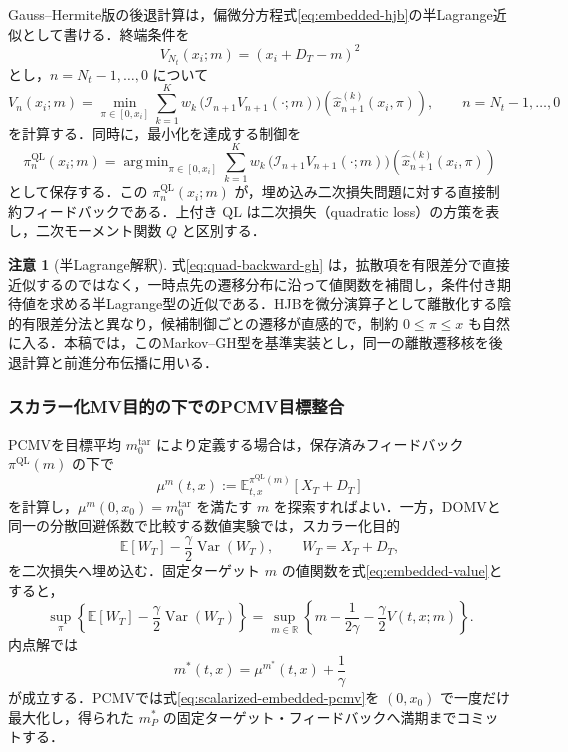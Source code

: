 \documentclass[10pt,a4paper]{article}
\theoremstyle{plain}
\theoremstyle{definition}
\newtheorem{remark}{注意}
\newcommand{\E}{\mathbb{E}}
\DeclareMathOperator{\Var}{Var}
\DeclareMathOperator*{\argmin}{arg\,min}
\begin{document}
Gauss--Hermite版の後退計算は，偏微分方程式\eqref{eq:embedded-hjb}の半Lagrange近似として書ける．終端条件を
\begin{equation}
  V_{N_t}(x_i;m)=(x_i+D_T-m)^2
  \label{eq:terminal-discrete-quad}
\end{equation}
とし，$n=N_t-1,\ldots,0$ について
\begin{equation}
  V_n(x_i;m)=
  \min_{\pi\in[0,x_i]}
  \sum_{k=1}^K w_k\,
  \bigl(\mathcal I_{n+1}V_{n+1}(\cdot;m)\bigr)
  \left(\widehat{x}_{n+1}^{(k)}(x_i,\pi)\right),
  \qquad n=N_t-1,\ldots,0
  \label{eq:quad-backward-gh}
\end{equation}
を計算する．同時に，最小化を達成する制御を
\begin{equation}
  \pi_n^{\mathrm{QL}}(x_i;m)=
  \argmin_{\pi\in[0,x_i]}
  \sum_{k=1}^K w_k\,
  \bigl(\mathcal I_{n+1}V_{n+1}(\cdot;m)\bigr)
  \left(\widehat{x}_{n+1}^{(k)}(x_i,\pi)\right)
  \label{eq:quad-feedback-gh}
\end{equation}
として保存する．この $\pi_n^{\mathrm{QL}}(x_i;m)$ が，埋め込み二次損失問題に対する直接制約フィードバックである．上付き $\mathrm{QL}$ は二次損失（quadratic loss）の方策を表し，二次モーメント関数 $Q$ と区別する．

\begin{remark}[半Lagrange解釈]
式\eqref{eq:quad-backward-gh} は，拡散項を有限差分で直接近似するのではなく，一時点先の遷移分布に沿って値関数を補間し，条件付き期待値を求める半Lagrange型の近似である．HJBを微分演算子として離散化する陰的有限差分法と異なり，候補制御ごとの遷移が直感的で，制約 $0\leq\pi\leq x$ も自然に入る．本稿では，このMarkov--GH型を基準実装とし，同一の離散遷移核を後退計算と前進分布伝播に用いる．
\end{remark}

\subsubsection{スカラー化MV目的の下でのPCMV目標整合}

PCMVを目標平均 $m_0^{\mathrm{tar}}$ により定義する場合は，保存済みフィードバック $\pi^{\mathrm{QL}}(m)$ の下で
\[
  \mu^m(t,x):=\E_{t,x}^{\pi^{\mathrm{QL}}(m)}[X_T+D_T]
\]
を計算し，$\mu^m(0,x_0)=m_0^{\mathrm{tar}}$ を満たす $m$ を探索すればよい．一方，DOMVと同一の分散回避係数で比較する数値実験では，スカラー化目的
\[
  \E[W_T]-\frac{\gamma}{2}\Var(W_T),
  \qquad W_T=X_T+D_T,
\]
を二次損失へ埋め込む．固定ターゲット $m$ の値関数を式\eqref{eq:embedded-value}とすると，
\begin{equation}
  \sup_{\pi}
  \left\{\E[W_T]-\frac{\gamma}{2}\Var(W_T)\right\}
  =\sup_{m\in\mathbb R}
  \left\{
    m-\frac{1}{2\gamma}-\frac{\gamma}{2}V(t,x;m)
  \right\}.
  \label{eq:scalarized-embedded-pcmv}
\end{equation}
内点解では
\begin{equation}
  m^*(t,x)=\mu^{m^*}(t,x)+\frac{1}{\gamma}
  \label{eq:embedded-fixed-point}
\end{equation}
が成立する．PCMVでは式\eqref{eq:scalarized-embedded-pcmv}を $(0,x_0)$ で一度だけ最大化し，得られた $m_P^*$ の固定ターゲット・フィードバックへ満期までコミットする．
\end{document}
